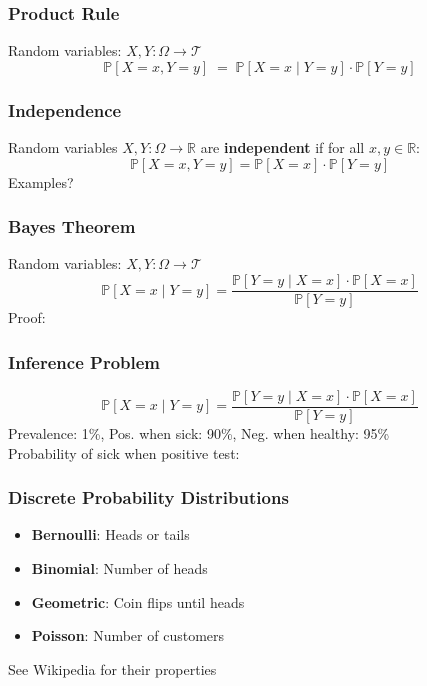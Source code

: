 \documentclass{beamer}
\newcommand{\Real}{\mathbb{R}}
\renewcommand{\P}[1]{\mathbb{P}\left[#1\right]}
\begin{document}
\begin{frame} \frametitle{Product Rule}
  Random variables: $X,Y \colon \Omega \to \mathcal{T} $
  \[
     \P{ X = x, Y = y } \; =\;  \P{ X = x \mid Y = y } \cdot \P{ Y = y }
  \] 
  \vspace{4.5cm}
\end{frame}

\begin{frame} \frametitle{Independence}
Random variables $X,Y \colon \Omega \to \Real$ are \textbf{independent} if for all $x,y \in \Real$:
\[\P{ X = x,Y = y } = \P{ X = x } \cdot  \P{ Y = y } \]
Examples?\\
\vspace{4cm}
\end{frame}

\begin{frame} \frametitle{Bayes Theorem}
  Random variables: $X,Y \colon \Omega \to \mathcal{T} $
  \[
   \P{ X = x \mid Y = y } =
    \frac{\P{ Y = y \mid X = x } \cdot \P{ X = x }}{\P{ Y = y }}
  \]
  Proof:
  \vspace{4cm}
\end{frame}

\begin{frame} \frametitle{Inference Problem}
  \[
    \P{ X = x \mid Y = y } =
    \frac{\P{ Y = y \mid X = x } \cdot \P{ X = x }}{\P{ Y = y }}
  \]
  Prevalence: 1\%, Pos. when sick: 90\%, Neg. when healthy: 95\%\\
  Probability of sick when positive test:
  \vspace{4cm}
\end{frame}

\begin{frame} \frametitle{Discrete Probability Distributions}
    \begin{itemize}
    \item \textbf{Bernoulli}: Heads or tails
    \item \textbf{Binomial}: Number of heads
    \item \textbf{Geometric}: Coin flips until heads
    \item \textbf{Poisson}: Number of customers 
    \end{itemize}
  {\small See Wikipedia for their properties}
\end{frame}
\end{document}
